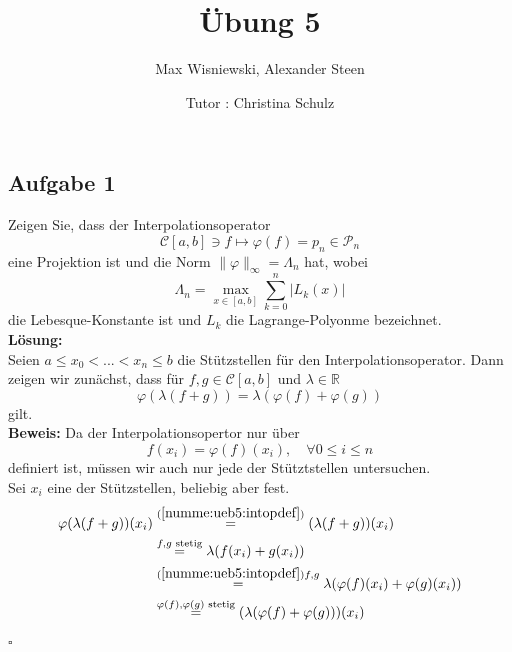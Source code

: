 \documentclass[11pt,a4paper,ngerman]{article}
\date{Tutor : Christina Schulz}
\title{Übung 5}
\author{Max Wisniewski, Alexander Steen}
\begin{document}

\renewcommand{\figurename}{Figure}

\maketitle
\thispagestyle{fancy}

\subsection*{Aufgabe 1}

Zeigen Sie, dass der Interpolationsoperator
\begin{equation*}
    \mathcal{C}[a,b] \ni f \mapsto \varphi (f) = p_n \in \mathcal{P}_n
\end{equation*}
eine Projektion ist und die Norm $\| \varphi \|_\infty = \Lambda_n$ hat, wobei
$$
    \Lambda_n = \underset{x \in [a,b]}{\max} \overset{n}{\underset{k=0}{\sum}} |L_k(x)|
$$
die Lebesque-Konstante ist und $L_k$ die Lagrange-Polyonme bezeichnet.\\

\textbf{Lösung:}\\

Seien $a \leq x_0 < ... < x_n \leq b$ die Stützstellen für den Interpolationsoperator.
Dann zeigen wir zunächst, dass für $f,g \in \mathcal{C}[a,b]$ und $\lambda \in \mathbb{R}$
\begin{equation*}
    \varphi(\lambda (f + g)) = \lambda (\varphi(f) + \varphi(g))
\end{equation*}
gilt.\\

\textbf{Beweis:}
Da der Interpolationsopertor nur über
\begin{equation}\label{numme:ueb5:intopdef}
    f(x_i) = \varphi(f)(x_i), \quad \forall 0 \leq i \leq n
\end{equation}
definiert ist, müssen wir auch nur jede der Stütztstellen untersuchen.\\

Sei $x_i$ eine der Stützstellen, beliebig aber fest.
\begin{equation}\begin{split}
    \varphi(\lambda (f + g))(x_i)
    &\stackrel{(\ref{numme:ueb5:intopdef})}{=} (\lambda (f + g))(x_i)\\
    &\stackrel{f,g\text{ stetig}}{=} \lambda (f(x_i) + g(x_i))\\
    &\stackrel{(\ref{numme:ueb5:intopdef})f,g}{=} \lambda (\varphi(f)(x_i) + \varphi(g)(x_i))\\
    &\stackrel{\varphi(f),\varphi(g)\text{ stetig}}{=} (\lambda (\varphi(f) + \varphi(g))) (x_i)
\end{split}\end{equation}
\mbox{}\hfill$\square$
\end{document}
